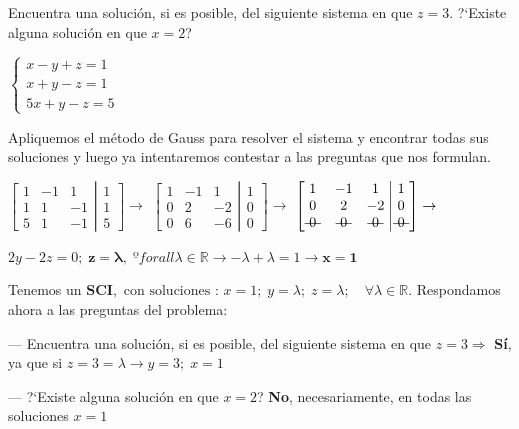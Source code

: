 \begin{ejre} 
Encuentra una solución, si es posible, del siguiente sistema en que $z=3$. ?`Existe alguna solución en que $x=2$?

$\begin{cases} x-y+z=1\\x+y-z=1\\5x+y-z=5  \end{cases}$
\end{ejre}
\begin{proofw}\renewcommand{\qedsymbol}{$\diamond$}
Apliquemos el método de Gauss para resolver el sistema y encontrar todas sus soluciones y luego ya intentaremos contestar a las preguntas que nos formulan.

$\left[ \begin{matrix}
  1 & -1 & 1 \\ 1 & 1 & -1 \\ 5 & 1 & -1 
 \end{matrix}\right. 
 \left| \begin{matrix}
  1 \\ 1 \\ 5 
 \end{matrix}\right] \to $
 $\left[ \begin{matrix}
  1 & -1 & 1 \\ 0 & 2 & -2 \\ 0 & 6 & -6 
 \end{matrix}\right. 
 \left| \begin{matrix}
  1 \\ 0 \\ 0 
 \end{matrix}\right] \to $
  $\left[ \begin{matrix}
  1 & -1 & 1 \\ 0 & 2 & -2 \\ \text{\textst{ 0 }} & \text{\textst{ 0 }} & \text{\textst{ 0 }} 
 \end{matrix}\right. 
 \left| \begin{matrix}
  1 \\ 0 \\ \text{\textst{ 0 }}
 \end{matrix}\right] \to $
 
 $2y-2z=0; \; \boldsymbol{z=\lambda}, \; ºforall \lambda \in \mathbb R \to -\lambda+\lambda=1 \to \boldsymbol{x=1}$
 
 Tenemos un $\textbf{SCI}, \text{ con soluciones : } x=1; \; y=\lambda; \; z=\lambda; \quad \forall \lambda \in \mathbb R$. Respondamos ahora a las preguntas del problema:
 
--- Encuentra una solución, si es posible, del siguiente sistema en que $z=3 \Rightarrow $ \textbf{Sí}, ya que si $z=3=\lambda \to y=3; \; x=1$
 
 --- ?`Existe alguna solución en que $x=2$? \textbf{No}, necesariamente, en todas las soluciones $x=1$
 
\end{proofw}

